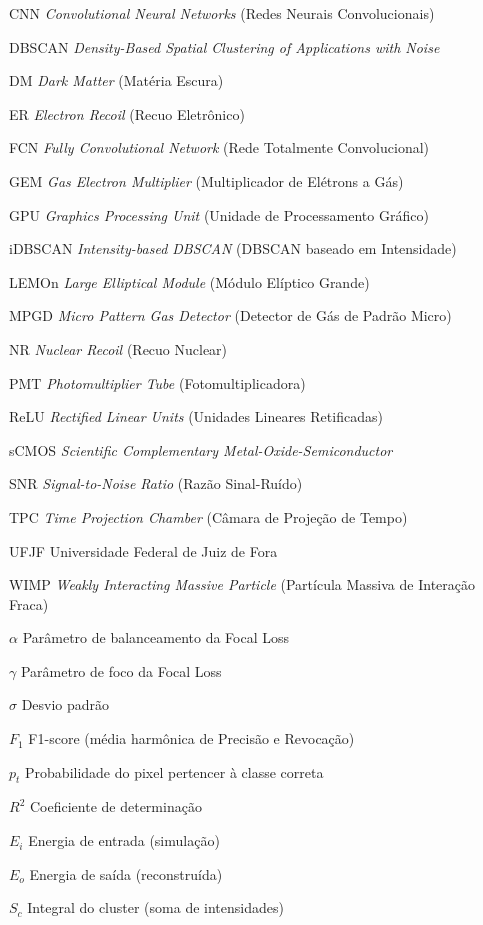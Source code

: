 \documentclass[
       oneside,
       english,
       brazil
       ]{abntbibufjf}
\begin{document}
\begin{siglas}
  \item[CNN]     \textit{Convolutional Neural Networks} (Redes Neurais Convolucionais)
  \item[DBSCAN]  \textit{Density-Based Spatial Clustering of Applications with Noise}
  \item[DM]      \textit{Dark Matter} (Matéria Escura)
  \item[ER]      \textit{Electron Recoil} (Recuo Eletrônico)
  \item[FCN]     \textit{Fully Convolutional Network} (Rede Totalmente Convolucional)
  \item[GEM]     \textit{Gas Electron Multiplier} (Multiplicador de Elétrons a Gás)
  \item[GPU]     \textit{Graphics Processing Unit} (Unidade de Processamento Gráfico)
  \item[iDBSCAN] \textit{Intensity-based DBSCAN} (DBSCAN baseado em Intensidade)
  \item[LEMOn]   \textit{Large Elliptical Module} (Módulo Elíptico Grande)
  \item[MPGD]    \textit{Micro Pattern Gas Detector} (Detector de Gás de Padrão Micro)
  \item[NR]      \textit{Nuclear Recoil} (Recuo Nuclear)
  \item[PMT]     \textit{Photomultiplier Tube} (Fotomultiplicadora)
  \item[ReLU]    \textit{Rectified Linear Units} (Unidades Lineares Retificadas)
  \item[sCMOS]   \textit{Scientific Complementary Metal-Oxide-Semiconductor}
  \item[SNR]     \textit{Signal-to-Noise Ratio} (Razão Sinal-Ruído)
  \item[TPC]     \textit{Time Projection Chamber} (Câmara de Projeção de Tempo)
  \item[UFJF]    Universidade Federal de Juiz de Fora
  \item[WIMP]    \textit{Weakly Interacting Massive Particle} (Partícula Massiva de Interação Fraca)
\end{siglas}

\begin{simbolos}
  \item[$\alpha$]         Parâmetro de balanceamento da Focal Loss
  \item[$\gamma$]         Parâmetro de foco da Focal Loss
  \item[$\sigma$]         Desvio padrão
  \item[$F_1$]            F1-score (média harmônica de Precisão e Revocação)
  \item[$p_t$]            Probabilidade do pixel pertencer à classe correta
  \item[$R^2$]            Coeficiente de determinação
  \item[$E_i$]            Energia de entrada (simulação)
  \item[$E_o$]            Energia de saída (reconstruída)
  \item[$S_c$]            Integral do cluster (soma de intensidades)
\end{simbolos}
\end{document}
